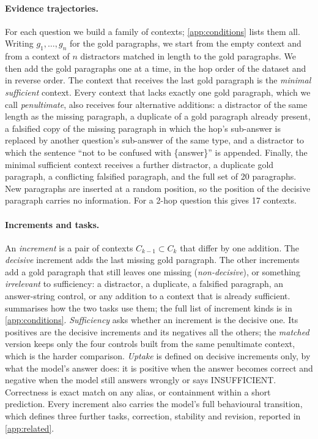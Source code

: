 \paragraph{Evidence trajectories.}
For each question we build a family of contexts; \cref{app:conditions} lists them all. Writing $g_1,\dots,g_n$ for the gold paragraphs, we start from the empty context and from a context of $n$ distractors matched in length to the gold paragraphs. We then add the gold paragraphs one at a time, in the hop order of the dataset and in reverse order. The context that receives the last gold paragraph is the \emph{minimal sufficient} context. Every context that lacks exactly one gold paragraph, which we call \emph{penultimate}, also receives four alternative additions: a distractor of the same length as the missing paragraph, a duplicate of a gold paragraph already present, a falsified copy of the missing paragraph in which the hop's sub-answer is replaced by another question's sub-answer of the same type, and a distractor to which the sentence ``not to be confused with \{answer\}'' is appended. Finally, the minimal sufficient context receives a further distractor, a duplicate gold paragraph, a conflicting falsified paragraph, and the full set of 20 paragraphs. New paragraphs are inserted at a random position, so the position of the decisive paragraph carries no information. For a 2-hop question this gives 17 contexts.

\paragraph{Increments and tasks.}
An \emph{increment} is a pair of contexts $C_{k-1}\subset C_k$ that differ by one addition. The \emph{decisive} increment adds the last missing gold paragraph. The other increments add a gold paragraph that still leaves one missing (\emph{non-decisive}), or something \emph{irrelevant} to sufficiency: a distractor, a duplicate, a falsified paragraph, an answer-string control, or any addition to a context that is already sufficient.  summarises how the two tasks use them; the full list of increment kinds is in \cref{app:conditions}. \emph{Sufficiency} asks whether an increment is the decisive one. Its positives are the decisive increments and its negatives all the others; the \emph{matched} version keeps only the four controls built from the same penultimate context, which is the harder comparison. \emph{Uptake} is defined on decisive increments only, by what the model's answer does: it is positive when the answer becomes correct and negative when the model still answers wrongly or says INSUFFICIENT. Correctness is exact match on any alias, or containment within a short prediction. Every increment also carries the model's full behavioural transition, which defines three further tasks, correction, stability and revision, reported in \cref{app:related}.

